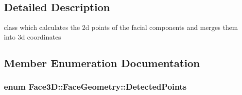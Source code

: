 \subsection{Detailed Description}
class which calculates the 2d points of the facial components and merges them into 3d coordinates 

\subsection{Member Enumeration Documentation}
\subsubsection[{\texorpdfstring{Detected\+Points}{DetectedPoints}}]{\setlength{\rightskip}{0pt plus 5cm}enum {\bf Face3\+D\+::\+Face\+Geometry\+::\+Detected\+Points}}\hypertarget{class_face3_d_1_1_face_geometry_aab597f00966010882927a4974649bf11}{}\label{class_face3_d_1_1_face_geometry_aab597f00966010882927a4974649bf11}
